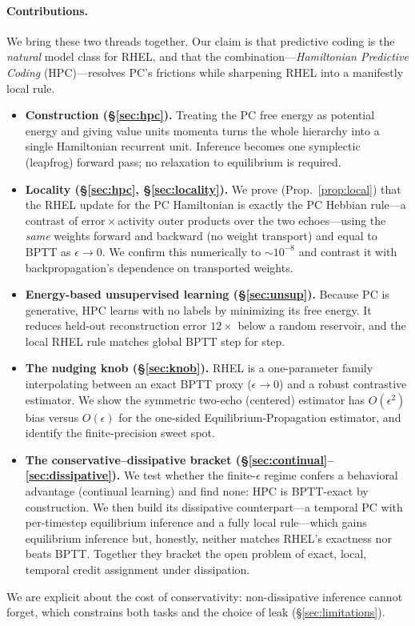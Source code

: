 \documentclass[10pt]{article}
\theoremstyle{remark}
\newcommand{\eps}{\epsilon}
\begin{document}
\paragraph{Contributions.} We bring these two threads together. Our claim is
that predictive coding is the \emph{natural} model class for RHEL, and that
the combination---\emph{Hamiltonian Predictive Coding} (HPC)---resolves PC's
frictions while sharpening RHEL into a manifestly local rule.
\begin{itemize}
\item \textbf{Construction (\S\ref{sec:hpc}).} Treating the PC free energy as
potential energy and giving value units momenta turns the whole hierarchy
into a single Hamiltonian recurrent unit. Inference becomes one symplectic
(leapfrog) forward pass; no relaxation to equilibrium is required.
\item \textbf{Locality (\S\ref{sec:hpc}, \S\ref{sec:locality}).} We prove
(Prop.~\ref{prop:local}) that the RHEL update for the PC Hamiltonian is
exactly the PC Hebbian rule---a contrast of error\,$\times$\,activity outer
products over the two echoes---using the \emph{same} weights forward and
backward (no weight transport) and equal to BPTT as $\eps\!\to\!0$. We confirm
this numerically to $\sim\!10^{-8}$ and contrast it with backpropagation's
dependence on transported weights.
\item \textbf{Energy-based unsupervised learning (\S\ref{sec:unsup}).} Because
PC is generative, HPC learns with no labels by minimizing its free energy. It
reduces held-out reconstruction error $12\times$ below a random reservoir,
and the local RHEL rule matches global BPTT step for step.
\item \textbf{The nudging knob (\S\ref{sec:knob}).} RHEL is a one-parameter
family interpolating between an exact BPTT proxy ($\eps\!\to\!0$) and a robust
contrastive estimator. We show the symmetric two-echo (centered) estimator
has $O(\eps^2)$ bias versus $O(\eps)$ for the one-sided
Equilibrium-Propagation estimator, and identify the finite-precision sweet
spot.
\item \textbf{The conservative--dissipative bracket (\S\ref{sec:continual}--\ref{sec:dissipative}).}
We test whether the finite-$\eps$ regime confers a behavioral advantage
(continual learning) and find none: HPC is BPTT-exact by construction. We then
build its dissipative counterpart---a temporal PC with per-timestep
equilibrium inference and a fully local rule---which gains equilibrium
inference but, honestly, neither matches RHEL's exactness nor beats BPTT.
Together they bracket the open problem of exact, local, temporal credit
assignment under dissipation.
\end{itemize}
We are explicit about the cost of conservativity: non-dissipative inference
cannot forget, which constrains both tasks and the choice of leak
(\S\ref{sec:limitations}).
\end{document}
